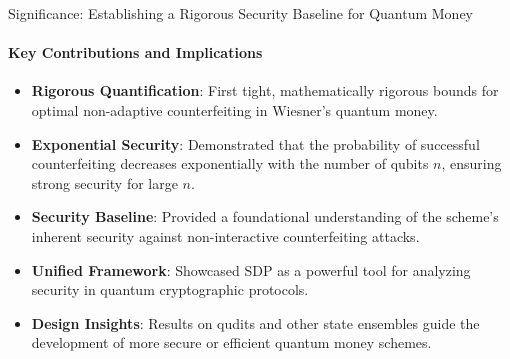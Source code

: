 \documentclass{beamer}
\begin{document}
\begin{frame}{Significance: Establishing a Rigorous Security Baseline for Quantum Money}
    \framesubtitle{Key Contributions and Implications}
    \begin{itemize}
        \item \textbf{Rigorous Quantification}: First tight, mathematically rigorous bounds for optimal non-adaptive counterfeiting in Wiesner's quantum money.
        \item \textbf{Exponential Security}: Demonstrated that the probability of successful counterfeiting decreases exponentially with the number of qubits $n$, ensuring strong security for large $n$.
        \item \textbf{Security Baseline}: Provided a foundational understanding of the scheme's inherent security against non-interactive counterfeiting attacks.
        \item \textbf{Unified Framework}: Showcased SDP as a powerful tool for analyzing security in quantum cryptographic protocols.
        \item \textbf{Design Insights}: Results on qudits and other state ensembles guide the development of more secure or efficient quantum money schemes.
    \end{itemize}
\end{frame}

\end{document}

